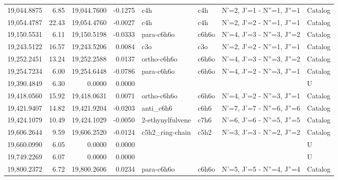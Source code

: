 \begin{longtable}{rrrrllll}
19,044.8875 &      6.85 &       19,044.7600 &   -0.1275 &                         c4h &     c4h &            N'=2, J'=1 - N''=1, J''=1 &    Catalog \\
19,054.4787 &     22.43 &       19,054.4760 &   -0.0027 &                         c4h &     c4h &            N'=2, J'=2 - N''=1, J''=1 &    Catalog \\
19,150.5531 &      6.11 &       19,150.5198 &   -0.0333 &                  para-c6h6o &   c6h6o &            N'=4, J'=3 - N''=3, J''=2 &    Catalog \\
19,243.5122 &     16.57 &       19,243.5206 &    0.0084 &                         c3o &     c3o &            N'=2, J'=2 - N''=1, J''=1 &    Catalog \\
19,252.2451 &     13.24 &       19,252.2588 &    0.0137 &                 ortho-c6h6o &   c6h6o &            N'=4, J'=3 - N''=3, J''=2 &    Catalog \\
19,254.7234 &      6.00 &       19,254.6448 &   -0.0786 &                  para-c6h6o &   c6h6o &            N'=4, J'=2 - N''=3, J''=1 &    Catalog \\
19,390.4849 &      6.30 &            0.0000 &    0.0000 &                             &         &                                      &          U \\
19,418.0560 &     15.92 &       19,418.0631 &    0.0071 &                 ortho-c6h6o &   c6h6o &            N'=4, J'=2 - N''=3, J''=1 &    Catalog \\
19,421.9407 &     14.82 &       19,421.9204 &   -0.0203 &                   anti_c6h6 &    c6h6 &            N'=7, J'=7 - N''=6, J''=6 &    Catalog \\
19,424.1079 &     10.49 &       19,424.1029 &   -0.0050 &            2-ethynylfulvene &    c7h6 &            N'=6, J'=6 - N''=5, J''=5 &    Catalog \\
19,606.2644 &      9.59 &       19,606.2520 &   -0.0124 &             c5h2_ring-chain &    c5h2 &            N'=3, J'=3 - N''=2, J''=2 &    Catalog \\
19,660.0990 &      6.05 &            0.0000 &    0.0000 &                             &         &                                      &          U \\
19,749.2269 &      6.07 &            0.0000 &    0.0000 &                             &         &                                      &          U \\
19,800.2372 &      6.72 &       19,800.2606 &    0.0234 &                  para-c6h6o &   c6h6o &            N'=5, J'=5 - N''=4, J''=4 &    Catalog \\

\end{longtable}
